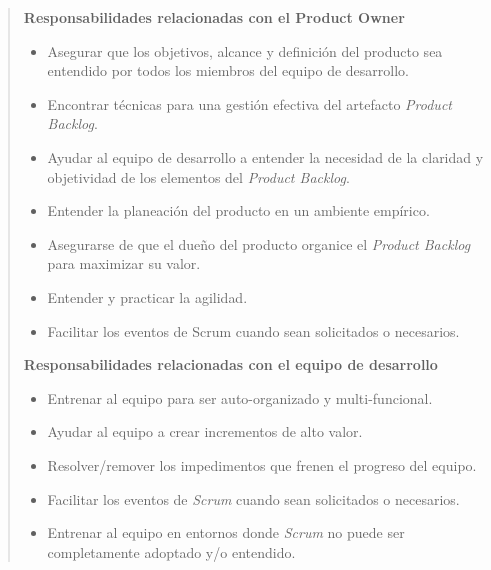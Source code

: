     \begin{quote}
    {\bf Responsabilidades relacionadas con el Product Owner }
    \begin{itemize}
    \item Asegurar que los objetivos, alcance y definición del producto sea
          entendido por todos los miembros del equipo de desarrollo.

    \item Encontrar técnicas para una gestión efectiva del artefacto
          {\it Product Backlog}.

    \item Ayudar al equipo de desarrollo a entender la necesidad de la claridad
          y objetividad de los elementos del {\it Product Backlog}.

    \item Entender la planeación del producto en un ambiente empírico.

    \item Asegurarse de que el dueño del producto organice el {\it Product
          Backlog} para maximizar su valor.

    \item Entender y practicar la agilidad.

    \item Facilitar los eventos de Scrum cuando sean solicitados o necesarios.\\
    \end{itemize}


    {\bf Responsabilidades relacionadas con el equipo de desarrollo}
    \begin{itemize}
    \item Entrenar al equipo para ser auto-organizado y multi-funcional.
    \item Ayudar al equipo a crear incrementos de alto valor.
    \item Resolver/remover los impedimentos que frenen el progreso del equipo.
    \item Facilitar los eventos de {\it Scrum} cuando sean solicitados o necesarios.
    \item Entrenar al equipo en entornos donde {\it Scrum} no puede ser completamente
          adoptado y/o entendido.\\
    \end{itemize}

    \end{quote}

